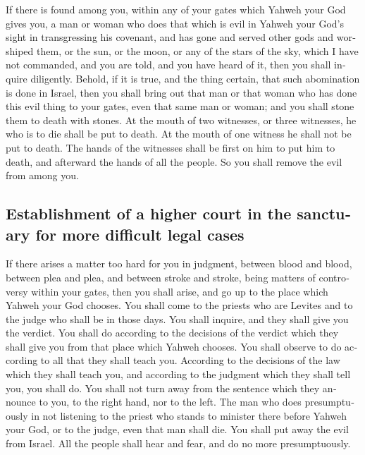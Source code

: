 \begin{paracol}{2}
\begin{otherlanguage}{english}
 If there is found among you, within any of your gates
which Yahweh your God gives you, a man or woman who does that which is
evil in Yahweh your God's sight in transgressing his covenant,
 and has gone and served other gods and worshiped them, or
the sun, or the moon, or any of the stars of the sky, which I have not
commanded,  and you are told, and you have heard of it,
then you shall inquire diligently. Behold, if it is true, and the thing
certain, that such abomination is done in Israel,  then
you shall bring out that man or that woman who has done this evil thing
to your gates, even that same man or woman; and you shall stone them to
death with stones.  At the mouth of two witnesses, or
three witnesses, he who is to die shall be put to death. At the mouth of
one witness he shall not be put to death.  The hands of
the witnesses shall be first on him to put him to death, and afterward
the hands of all the people. So you shall remove the evil from among
you.

\hypertarget{establishment-of-a-higher-court-in-the-sanctuary-for-more-difficult-legal-cases}{%
\subsection{Establishment of a higher court in the sanctuary for more
difficult legal
cases}\label{establishment-of-a-higher-court-in-the-sanctuary-for-more-difficult-legal-cases}}

 If there arises a matter too hard for you in judgment,
between blood and blood, between plea and plea, and between stroke and
stroke, being matters of controversy within your gates, then you shall
arise, and go up to the place which Yahweh your God chooses.
 You shall come to the priests who are Levites and to the
judge who shall be in those days. You shall inquire, and they shall give
you the verdict.  You shall do according to the decisions
of the verdict which they shall give you from that place which Yahweh
chooses. You shall observe to do according to all that they shall teach
you.  According to the decisions of the law which they
shall teach you, and according to the judgment which they shall tell
you, you shall do. You shall not turn away from the sentence which they
announce to you, to the right hand, nor to the left.  The
man who does presumptuously in not listening to the priest who stands to
minister there before Yahweh your God, or to the judge, even that man
shall die. You shall put away the evil from Israel.  All
the people shall hear and fear, and do no more presumptuously.


\end{otherlanguage}
\end{paracol}
